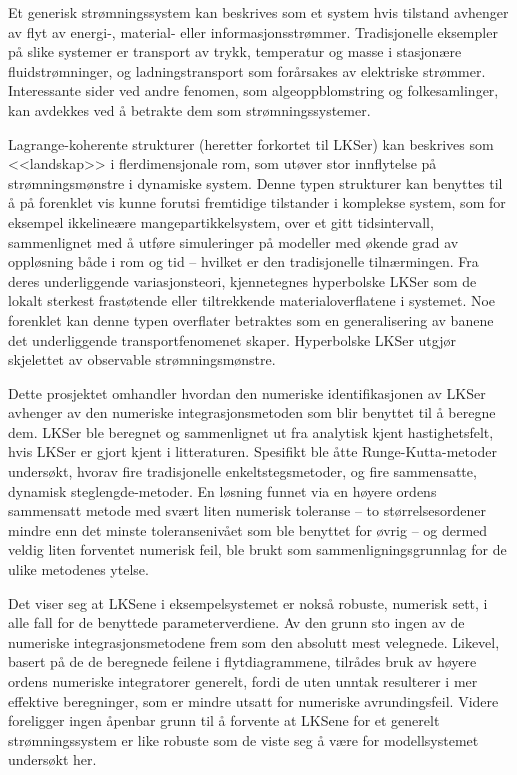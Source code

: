 Et generisk strømningssystem kan beskrives som et system hvis tilstand
avhenger av flyt av energi-, material- eller informasjonsstrømmer. Tradisjonelle
eksempler på slike systemer er transport av trykk, temperatur og masse i
stasjonære fluidstrømninger, og ladningstransport som forårsakes av elektriske
strømmer. Interessante sider ved andre fenomen, som algeoppblomstring og
folkesamlinger, kan avdekkes ved å betrakte dem som strømningssystemer.

Lagrange-koherente strukturer (heretter forkortet til LKSer) kan beskrives som
<<landskap>> i flerdimensjonale rom, som utøver stor innflytelse på
strømningsmønstre i dynamiske system. Denne typen strukturer kan benyttes til
å på forenklet vis kunne forutsi fremtidige tilstander i komplekse system, som
for eksempel ikkelineære mangepartikkelsystem, over et gitt tidsintervall,
sammenlignet med å utføre simuleringer på modeller med økende grad av
oppløsning både i rom og tid -- hvilket er den tradisjonelle tilnærmingen. Fra
deres underliggende variasjonsteori, kjennetegnes hyperbolske LKSer som de
lokalt sterkest frastøtende eller tiltrekkende materialoverflatene i systemet.
Noe forenklet kan denne typen overflater betraktes som en generalisering av
banene det underliggende transportfenomenet skaper. Hyperbolske LKSer utgjør
skjelettet av observable strømningsmønstre.

Dette prosjektet omhandler hvordan den numeriske identifikasjonen av LKSer
avhenger av den numeriske integrasjonsmetoden som blir benyttet til å beregne
dem. LKSer ble beregnet og sammenlignet ut fra analytisk
kjent hastighetsfelt, hvis LKSer er gjort kjent i litteraturen. Spesifikt
ble åtte Runge-Kutta-metoder undersøkt, hvorav fire tradisjonelle
enkeltstegsmetoder, og fire sammensatte, dynamisk steglengde-metoder. En
løsning funnet via en høyere ordens sammensatt metode med svært liten
numerisk toleranse -- to størrelsesordener mindre enn det minste toleransenivået
som ble benyttet for
øvrig -- og dermed veldig liten forventet numerisk feil, ble brukt som
sammenligningsgrunnlag for de ulike metodenes ytelse.

Det viser seg at LKSene i eksempelsystemet er nokså robuste, numerisk sett,
i alle fall for de benyttede parameterverdiene. Av den grunn sto ingen av de
numeriske integrasjonsmetodene frem som den absolutt mest
velegnede. Likevel, basert på de de beregnede feilene i flytdiagrammene,
tilrådes bruk av høyere ordens numeriske integratorer generelt, fordi de uten
unntak resulterer i mer effektive beregninger,
som er mindre utsatt for numeriske avrundingsfeil. Videre foreligger ingen
åpenbar grunn til å forvente at LKSene for et generelt strømningssystem er like
robuste som de viste seg å være for modellsystemet undersøkt her.

